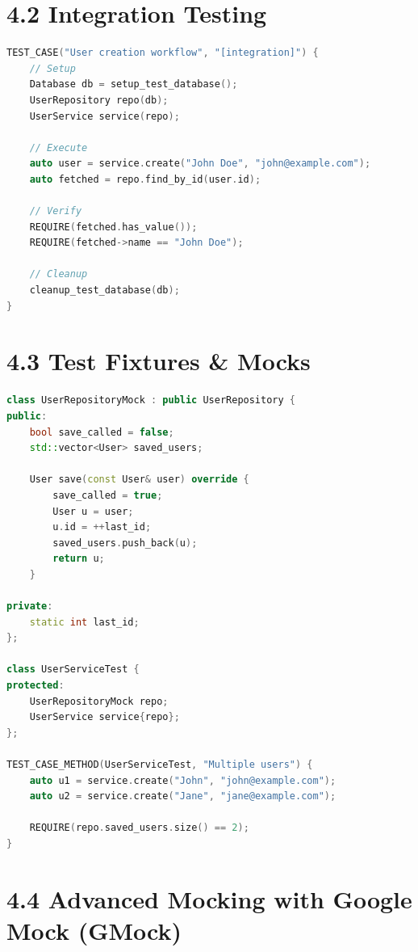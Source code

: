 \hypertarget{integration-testing}{%
\section{4.2 Integration Testing}\label{integration-testing}}

\begin{lstlisting}[language={C++}]
TEST_CASE("User creation workflow", "[integration]") {
    // Setup
    Database db = setup_test_database();
    UserRepository repo(db);
    UserService service(repo);
    
    // Execute
    auto user = service.create("John Doe", "john@example.com");
    auto fetched = repo.find_by_id(user.id);
    
    // Verify
    REQUIRE(fetched.has_value());
    REQUIRE(fetched->name == "John Doe");
    
    // Cleanup
    cleanup_test_database(db);
}
\end{lstlisting}

\hypertarget{test-fixtures-mocks}{%
\section{4.3 Test Fixtures \& Mocks}\label{test-fixtures-mocks}}

\begin{lstlisting}[language={C++}]
class UserRepositoryMock : public UserRepository {
public:
    bool save_called = false;
    std::vector<User> saved_users;
    
    User save(const User& user) override {
        save_called = true;
        User u = user;
        u.id = ++last_id;
        saved_users.push_back(u);
        return u;
    }
    
private:
    static int last_id;
};

class UserServiceTest {
protected:
    UserRepositoryMock repo;
    UserService service{repo};
};

TEST_CASE_METHOD(UserServiceTest, "Multiple users") {
    auto u1 = service.create("John", "john@example.com");
    auto u2 = service.create("Jane", "jane@example.com");
    
    REQUIRE(repo.saved_users.size() == 2);
}
\end{lstlisting}

\hypertarget{advanced-mocking-with-google-mock-gmock}{%
\section{4.4 Advanced Mocking with Google Mock
(GMock)}\label{advanced-mocking-with-google-mock-gmock}}

